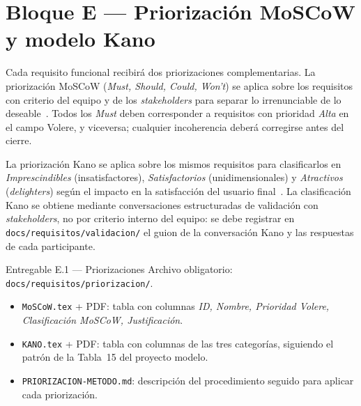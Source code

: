 \documentclass[11pt,a4paper]{article}
\begin{document}
\section{Bloque E --- Priorizaci\'on MoSCoW y modelo Kano}

Cada requisito funcional recibir\'a dos priorizaciones complementarias. La priorizaci\'on MoSCoW (\emph{Must, Should, Could, Won't}) se aplica sobre los requisitos con criterio del equipo y de los \emph{stakeholders} para separar lo irrenunciable de lo deseable~\cite{wiegers2013software,cohn2004userstories}. Todos los \emph{Must} deben corresponder a requisitos con prioridad \emph{Alta} en el campo Volere, y viceversa; cualquier incoherencia deber\'a corregirse antes del cierre.

La priorizaci\'on Kano se aplica sobre los mismos requisitos para clasificarlos en \emph{Imprescindibles} (insatisfactores), \emph{Satisfactorios} (unidimensionales) y \emph{Atractivos} (\emph{delighters}) seg\'un el impacto en la satisfacci\'on del usuario final~\cite{kano1984attractive,tan2000kano}. La clasificaci\'on Kano se obtiene mediante conversaciones estructuradas de validaci\'on con \emph{stakeholders}, no por criterio interno del equipo: se debe registrar en \texttt{docs/requisitos/validacion/} el guion de la conversaci\'on Kano y las respuestas de cada participante.

\begin{cajaentregable}{Entregable E.1 --- Priorizaciones}
Archivo obligatorio: \texttt{docs/requisitos/priorizacion/}.
\begin{itemize}
    \item \texttt{MoSCoW.tex} + PDF: tabla con columnas \emph{ID, Nombre, Prioridad Volere, Clasificaci\'on MoSCoW, Justificaci\'on}.
    \item \texttt{KANO.tex} + PDF: tabla con columnas de las tres categor\'ias, siguiendo el patr\'on de la Tabla~15 del proyecto modelo.
    \item \texttt{PRIORIZACION-METODO.md}: descripci\'on del procedimiento seguido para aplicar cada priorizaci\'on.
\end{itemize}
\end{cajaentregable}

\end{document}
